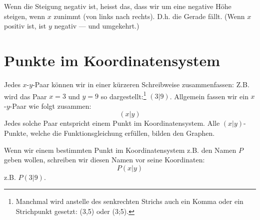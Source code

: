 \documentclass[%
11pt,%
twoside,%
titlepage,%
german,%
headsepline%
]{scrartcl}
\begin{document}
Wenn die Steigung negativ ist, heisst das, dass wir um eine negative H\"ohe steigen, wenn $x$ zunimmt (von links nach rechts). D.h. die Gerade f\"allt. (Wenn $x$ positiv ist, ist $y$ negativ --- und umgekehrt.)


\section{Punkte im Koordinatensystem}
\label{linfkt1:punkte}

Jedes $x$-$y$-Paar k\"onnen wir in einer k\"urzeren Schreibweise zusammenfassen: Z.B. wird das Paar $x=3$ und $y=9$ so dargestellt:\footnote{Manchmal wird anstelle des senkrechten Strichs auch ein Komma oder ein Strichpunkt gesetzt: (3,5) oder (3;5).} $(3|9)$. Allgemein fassen wir ein $x$-$y$-Paar wie folgt zusammen:
\begin{displaymath}
  (x|y)
\end{displaymath}
Jedes solche Paar entspricht einem Punkt im Koordinatensystem. Alle $(x|y)$-Punkte, welche die Funktionsgleichung erf\"ullen, bilden den Graphen.

Wenn wir einem bestimmten Punkt im Koordinatensystem z.B. den Namen $P$ geben wollen, schreiben wir diesen Namen vor seine Koordinaten:
\begin{displaymath}
  P(x|y)
\end{displaymath}
z.B. $P(3|9)$.
\end{document}

